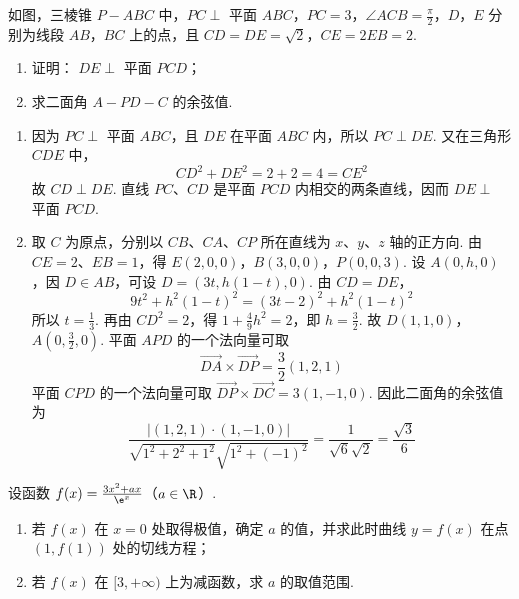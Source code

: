 \begin{problem}
如图，三棱锥 \(P - ABC\) 中，\(PC \perp\) 平面 \(ABC\)，\(PC = 3\)，\(\angle ACB = \frac{\pi}{2}\)，\(D\)，\(E\) 分别为线段 \(AB\)，\(BC\) 上的点，且 \(CD = DE = \sqrt{2}\)，\(CE = 2EB = 2\).

\begin{enumerate}
\item 证明： \(DE \perp\) 平面 \(PCD\)；
\item 求二面角 \(A - PD - C\) 的余弦值.
\end{enumerate}

\end{problem}

\begin{solution}
\begin{enumerate}
\item 因为 \(PC\perp\) 平面 \(ABC\)，且 \(DE\) 在平面 \(ABC\) 内，所以 \(PC\perp DE\). 又在三角形 \(CDE\) 中，
\[
CD^2+DE^2=2+2=4=CE^2
\]
故 \(CD\perp DE\). 直线 \(PC\)、\(CD\) 是平面 \(PCD\) 内相交的两条直线，因而 \(DE\perp\) 平面 \(PCD\).
\item 取 \(C\) 为原点，分别以 \(CB\)、\(CA\)、\(CP\) 所在直线为 \(x\)、\(y\)、\(z\) 轴的正方向. 由 \(CE=2\)、\(EB=1\)，得
\(E(2,0,0)\)，\(B(3,0,0)\)，\(P(0,0,3)\).
设 \(A(0,h,0)\)，因 \(D\in AB\)，可设 \(D=(3t,h(1-t),0)\). 由 \(CD=DE\)，
\[
9t^2+h^2(1-t)^2=(3t-2)^2+h^2(1-t)^2
\]
所以 \(t=\frac13\). 再由 \(CD^2=2\)，得 \(1+\frac49h^2=2\)，即 \(h=\frac32\). 故
\(D(1,1,0)\)，\(A\left(0,\frac32,0\right)\).
平面 \(APD\) 的一个法向量可取
\[
\overrightarrow{DA}\times\overrightarrow{DP}=\frac32(1,2,1)
\]
平面 \(CPD\) 的一个法向量可取 \(\overrightarrow{DP}\times\overrightarrow{DC}=3(1,-1,0)\). 因此二面角的余弦值为
\[
\frac{\left|(1,2,1)\cdot(1,-1,0)\right|}{\sqrt{1^2+2^2+1^2}\sqrt{1^2+(-1)^2}}=\frac{1}{\sqrt6\sqrt2}=\frac{\sqrt3}{6}
\]
\end{enumerate}
\end{solution}

\begin{problem}
设函数 \( f(x) = \frac{3x^2 + ax}{\e^x}  \)（\(a \in \R\)）.

\begin{enumerate}
\item 若 \( f(x) \) 在 \( x = 0 \) 处取得极值，确定 \( a \) 的值，并求此时曲线 \( y = f(x) \) 在点 \((1, f(1))\) 处的切线方程；
\item 若 \( f(x) \) 在 \([3, +\infty)\) 上为减函数，求 \( a \) 的取值范围.
\end{enumerate}
\end{problem}

